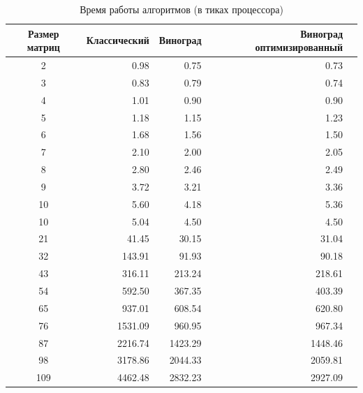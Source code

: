 \begin{table}[h]
	\begin{center}
		\begin{threeparttable}
		\captionsetup{justification=raggedright,singlelinecheck=off}
		\caption{Время работы алгоритмов (в тиках процессора)}
		\label{tbl:time_measurements}
		\begin{tabular}{|c|r|r|r|r|}
			\hline
			Размер матриц &  Классический & Виноград & Виноград оптимизированный \\
			\hline
                        2 & 0.98 & 0.75 & 0.73 \\ \hline 
                        3 & 0.83 & 0.79 & 0.74 \\ \hline 
                        4 & 1.01 & 0.90 & 0.90 \\ \hline 
                        5 & 1.18 & 1.15 & 1.23 \\ \hline 
                        6 & 1.68 & 1.56 & 1.50 \\ \hline 
                        7 & 2.10 & 2.00 & 2.05 \\ \hline 
                        8 & 2.80 & 2.46 & 2.49 \\ \hline 
                        9 & 3.72 & 3.21 & 3.36 \\ \hline 
                        10 & 5.60 & 4.18 & 5.36 \\ \hline 
                        10 & 5.04 & 4.50 & 4.50 \\ \hline 
                        21 & 41.45 & 30.15 & 31.04 \\ \hline 
                        32 & 143.91 & 91.93 & 90.18 \\ \hline 
                        43 & 316.11 & 213.24 & 218.61 \\ \hline 
                        54 & 592.50 & 367.35 & 403.39 \\ \hline 
                        65 & 937.01 & 608.54 & 620.80 \\ \hline 
                        76 & 1531.09 & 960.95 & 967.34 \\ \hline 
                        87 & 2216.74 & 1423.29 & 1448.46 \\ \hline 
                        98 & 3178.86 & 2044.33 & 2059.81 \\ \hline 
                        109 & 4462.48 & 2832.23 & 2927.09 \\ \hline 
		\end{tabular}
		\end{threeparttable}
    \end{center}
\end{table}


